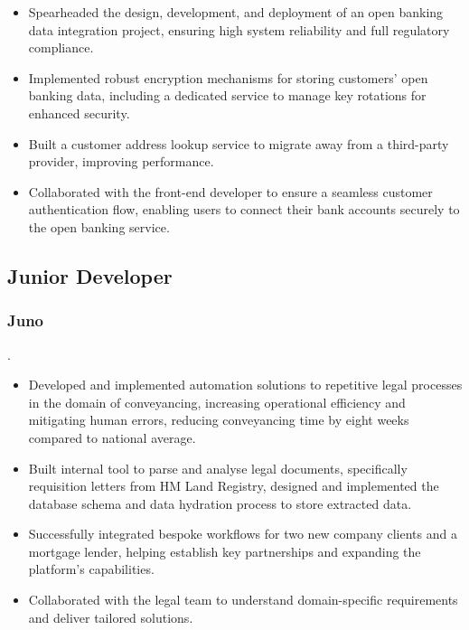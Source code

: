\documentclass{article}
\begin{document}
  \begin{itemize}[leftmargin=*]
    \setlength\itemsep{-2pt}
    \item Spearheaded the design, development, and deployment of an open banking data integration project, ensuring high system reliability and full regulatory compliance.
    \item Implemented robust encryption mechanisms for storing customers' open banking data, including a dedicated service to manage key rotations for enhanced security.
    \item Built a customer address lookup service to migrate away from a third-party provider, improving performance.
    \item Collaborated with the front-end developer to ensure a seamless customer authentication flow, enabling users to connect their bank accounts securely to the open banking service.
  \end{itemize}

  \subsection{Junior Developer}
  \subsubsection{Juno}
  {\color{LightGrey}\scriptsize\href{https://www.juno.legal}{\faExternalLink}}
  {\color{TitleGrey}{\small a law firm that uses an in-house proprietary case management system to automate aspects of conveyancing.}.}
  \hspace*{\fill}{\color{TitleGrey}{\scriptsize\faCalendar}\hspace{5pt}{\small10/2021 -- 12/2022}}
  
  \begin{itemize}[leftmargin=*]
    \setlength\itemsep{-2pt}
    \item Developed and implemented automation solutions to repetitive legal processes in the domain of conveyancing, increasing operational efficiency and mitigating human errors, reducing conveyancing time by eight weeks compared to national average. {\color{LightGrey}\scriptsize\href{https://www.juno.legal/information/how-long-does-conveyancing-take/}{\faExternalLink}}
    \item Built internal tool to parse and analyse legal documents, specifically requisition letters from HM Land Registry, designed and implemented the database schema and data hydration process to store extracted data.
    \item Successfully integrated bespoke workflows for two new company clients and a mortgage lender, helping establish key partnerships and expanding the platform's capabilities.
    \item Collaborated with the legal team to understand domain-specific requirements and deliver tailored solutions.
  \end{itemize}
\end{document}
